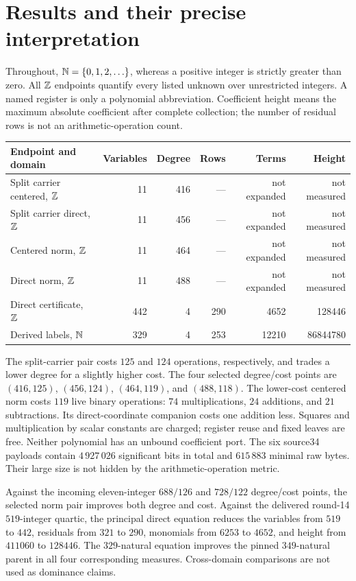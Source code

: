 \section{Results and their precise interpretation}
Throughout, $\mathbb N=\{0,1,2,\ldots\}$, whereas a positive integer is strictly greater than zero. All $\mathbb Z$ endpoints quantify every listed unknown over unrestricted integers. A named register is only a polynomial abbreviation. Coefficient height means the maximum absolute coefficient after complete collection; the number of residual rows is not an arithmetic-operation count.

\begin{center}\small
\begin{tabular}{@{}lrrrrr@{}}\toprule
Endpoint and domain&Variables&Degree&Rows&Terms&Height\\\midrule
Split carrier centered, $\mathbb Z$&11&416&---&not expanded&not measured\\
Split carrier direct, $\mathbb Z$&11&456&---&not expanded&not measured\\
Centered norm, $\mathbb Z$&11&464&---&not expanded&not measured\\
Direct norm, $\mathbb Z$&11&488&---&not expanded&not measured\\
Direct certificate, $\mathbb Z$&442&4&290&4652&128446\\
Derived labels, $\mathbb N$&329&4&253&12210&86844780\\\bottomrule
\end{tabular}\end{center}
The split-carrier pair costs $125$ and $124$ operations, respectively, and trades a lower degree for a slightly higher cost. The four selected degree/cost points are $(416,125)$, $(456,124)$, $(464,119)$, and $(488,118)$. The lower-cost centered norm costs $119$ live binary operations: $74$ multiplications, $24$ additions, and $21$ subtractions. Its direct-coordinate companion costs one addition less. Squares and multiplication by scalar constants are charged; register reuse and fixed leaves are free. Neither polynomial has an unbound coefficient port. The six source34 payloads contain $4\,927\,026$ significant bits in total and $615\,883$ minimal raw bytes. Their large size is not hidden by the arithmetic-operation metric.

Against the incoming eleven-integer $688/126$ and $728/122$ degree/cost points, the selected norm pair improves both degree and cost. Against the delivered round-14 $519$-integer quartic, the principal direct equation reduces the variables from $519$ to $442$, residuals from $321$ to $290$, monomials from $6253$ to $4652$, and height from $411060$ to $128446$. The $329$-natural equation improves the pinned $349$-natural parent in all four corresponding measures. Cross-domain comparisons are not used as dominance claims.


